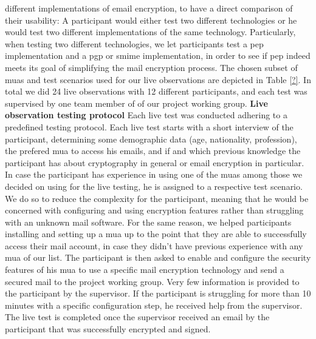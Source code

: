 different implementations of \acrshort{email} encryption, to have a direct comparison of their usability:
A participant would either test two different technologies or he would test two different implementations of the same technology. Particularly, when testing two different technologies, we let participants test a \acrshort{pep} implementation and a \acrshort{pgp} or \acrshort{smime} implementation, in order to see if \acrshort{pep} indeed meets its goal of simplifying the mail encryption process.
The chosen subset of \acrshort{mua}s and test scenarios used for our live observations are depicted in Table \ref{?}. In total we did 24 live observations with 12 different participants, and each test was supervised by one team member of of our project working group.
\newline
\newline
\textbf{Live observation testing protocol}
\newline
Each live test was conducted adhering to a predefined testing protocol. Each live test starts with a short interview of the participant, determining some demographic data (age, nationality, profession), the prefered \acrshort{mua} to access his \acrshort{email}s, and if and which previous knowledge the participant has about cryptography in general or email encryption in particular. In case the participant has experience in using one of the \acrshort{mua}s among those we decided on using for the live testing, he is assigned to a respective test scenario. We do so to reduce the complexity for the participant, meaning that he would be concerned with configuring and using encryption features rather than struggling with an unknown mail software. For the same reason, we helped participants installing and setting up a \acrshort{mua} up to the point that they are able to successfully access their mail account, in case they didn’t have previous experience with any \acrshort{mua} of our list. The participant is then asked to enable and configure the security features of his \acrshort{mua} to use a specific mail encryption technology and send a secured mail to the project working group. Very few information is provided to the participant by the supervisor. If the participant is struggling for more than 10 minutes with a specific configuration step, he received help from the supervisor. The live test is completed once the supervisor received an \acrshort{email} by the participant that was successfully encrypted and signed.
